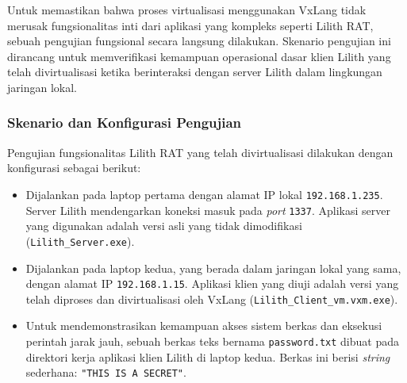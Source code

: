 Untuk memastikan bahwa proses virtualisasi menggunakan VxLang tidak merusak fungsionalitas inti dari aplikasi yang kompleks seperti Lilith RAT, sebuah pengujian fungsional secara langsung dilakukan. Skenario pengujian ini dirancang untuk memverifikasi kemampuan operasional dasar klien Lilith yang telah divirtualisasi ketika berinteraksi dengan server Lilith dalam lingkungan jaringan lokal.

\subsubsection{Skenario dan Konfigurasi Pengujian}
Pengujian fungsionalitas Lilith RAT yang telah divirtualisasi dilakukan dengan konfigurasi sebagai berikut:
\begin{itemize}
    \item {} Dijalankan pada laptop pertama dengan alamat IP lokal \texttt{192.168.1.235}. Server Lilith mendengarkan koneksi masuk pada \textit{port} \texttt{1337}. Aplikasi server yang digunakan adalah versi asli yang tidak dimodifikasi (\texttt{Lilith\_Server.exe}).
    \item {} Dijalankan pada laptop kedua, yang berada dalam jaringan lokal yang sama, dengan alamat IP \texttt{192.168.1.15}. Aplikasi klien yang diuji adalah versi yang telah diproses dan divirtualisasi oleh VxLang (\texttt{Lilith\_Client\_vm.vxm.exe}).
    \item {} Untuk mendemonstrasikan kemampuan akses sistem berkas dan eksekusi perintah jarak jauh, sebuah berkas teks bernama \texttt{password.txt} dibuat pada direktori kerja aplikasi klien Lilith di laptop kedua. Berkas ini berisi \textit{string} sederhana: \texttt{"THIS IS A SECRET"}.
\end{itemize}

